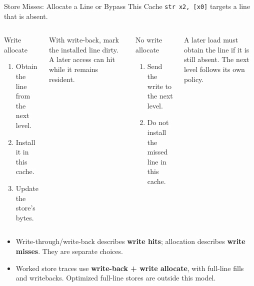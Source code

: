 \documentclass[aspectratio=169,11pt,t]{beamer}
\newcommand{\key}[1]{\textbf{#1}}
\newcommand{\code}[1]{\texttt{#1}}
\begin{document}
\begin{frame}{Store Misses: Allocate a Line or Bypass This Cache}
\small
\code{str x2, [x0]} targets a line that is absent.
\begin{columns}[T,onlytextwidth]
\begin{block}{Write allocate}
\begin{enumerate}\setlength{\itemsep}{5pt}
  \item Obtain the line from the next level.
  \item Install it in this cache.
  \item Update the store's bytes.
\end{enumerate}
\end{block}
\small With write-back, mark the installed line dirty. A later access can hit while it remains resident.
\begin{block}{No write allocate}
\begin{enumerate}\setlength{\itemsep}{5pt}
  \item Send the write to the next level.
  \item Do not install the missed line in this cache.
\end{enumerate}
\end{block}
\small A later load must obtain the line if it is still absent. The next level follows its own policy.
\end{columns}
\vspace{.24cm}
\begin{itemize}\setlength{\itemsep}{6pt}
  \item Write-through/write-back describes \key{write hits}; allocation describes \key{write misses}. They are separate choices.
  \item Worked store traces use \key{write-back + write allocate}, with full-line fills and writebacks. Optimized full-line stores are outside this model.
\end{itemize}
\end{frame}
\end{document}
